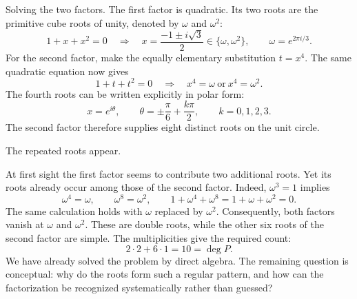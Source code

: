 \documentclass[11pt,aspectratio=169]{beamer}
\newcommand{\slidebody}{%
  \fontsize{10.6}{12.8}\selectfont\justifying%
  \setlength{\parskip}{4.2pt}%
  \setlength{\abovedisplayskip}{4pt}%
  \setlength{\belowdisplayskip}{4pt}%
  \setlength{\abovedisplayshortskip}{2pt}%
  \setlength{\belowdisplayshortskip}{2.5pt}%
}
\newcommand{\tightbody}{\slidebody\fontsize{10.2}{12.3}\selectfont\setlength{\parskip}{3pt}}
\begin{document}
\begin{frame}[t]{Solving the two factors.}
\tightbody
The first factor is quadratic. Its two roots are the primitive cube roots of unity, denoted by $\omega$ and $\omega^2$:
\begin{equation}\label{eq:quadratic}
  1+x+x^2=0
  \quad\Longrightarrow\quad
  x=\frac{-1\pm i\sqrt{3}}{2}\in\{\omega,\omega^2\},
  \qquad \omega=e^{2\pi i/3}.
\end{equation}
For the second factor, make the equally elementary substitution $t=x^4$. The same quadratic equation now gives
\begin{equation}\label{eq:t-substitution}
  1+t+t^2=0
  \quad\Longrightarrow\quad
  x^4=\omega\ \text{or}\ x^4=\omega^2.
\end{equation}
The fourth roots can be written explicitly in polar form:
\begin{equation}\label{eq:ansatz-roots}
  x=e^{i\theta},\qquad
  \theta=\pm\frac{\pi}{6}+\frac{k\pi}{2},\qquad k=0,1,2,3.
\end{equation}
The second factor therefore supplies eight distinct roots on the unit circle.
\end{frame}

\begin{frame}[t]{The repeated roots appear.}
\slidebody
At first sight the first factor seems to contribute two additional roots. Yet its roots already occur among those of the second factor. Indeed, $\omega^3=1$ implies
\begin{equation}\label{eq:omega-powers}
  \omega^4=\omega,\qquad \omega^8=\omega^2,
  \qquad 1+\omega^4+\omega^8=1+\omega+\omega^2=0.
\end{equation}
The same calculation holds with $\omega$ replaced by $\omega^2$. Consequently, both factors vanish at $\omega$ and $\omega^2$. These are double roots, while the other six roots of the second factor are simple. The multiplicities give the required count:
\begin{equation}\label{eq:count-early}
  2\cdot 2+6\cdot 1=10=\deg P.
\end{equation}
We have already solved the problem by direct algebra. The remaining question is conceptual: why do the roots form such a regular pattern, and how can the factorization be recognized systematically rather than guessed?
\end{frame}
\end{document}
